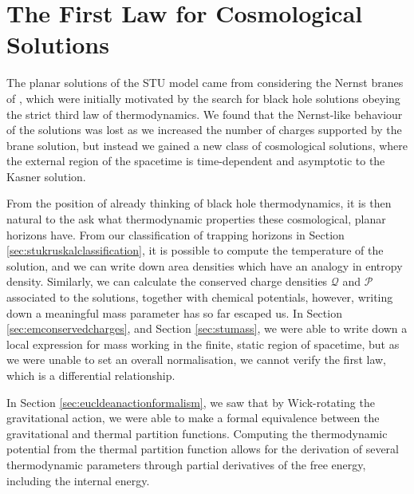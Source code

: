 \chapter{The First Law for Cosmological Solutions}
\label{ch:triplewick}

The planar solutions of the STU model came from considering the Nernst branes of \cite{Dempster:2015}, which were initially motivated by the search for black hole solutions obeying the strict third law of thermodynamics. We found that the Nernst-like behaviour of the solutions was lost as we increased the number of charges supported by the brane solution, but instead we gained a new class of cosmological solutions, where the external region of the spacetime is time-dependent and asymptotic to the Kasner solution. 

From the position of already thinking of black hole thermodynamics, it is then natural to the ask what thermodynamic properties these cosmological, planar horizons have. From our classification of trapping horizons in Section \ref{sec:stukruskalclassification}, it is possible to compute the temperature of the solution, and we can write down area densities which have an analogy in entropy density. Similarly, we can calculate the conserved charge densities $\mathcal{Q}$ and $\mathcal{P}$ associated to the solutions, together with chemical potentials, however, writing down a meaningful mass parameter has so far escaped us. In Section \ref{sec:emconservedcharges}, and Section \ref{sec:stumass}, we were able to write down a local expression for mass working in the finite, static region of spacetime, but as we were unable to set an overall normalisation, we cannot verify the first law, which is a differential relationship.

In Section \ref{sec:eucldeanactionformalism}, we saw that by Wick-rotating the gravitational action, we were able to make a formal equivalence between the gravitational and thermal partition functions. Computing the thermodynamic potential from the thermal partition function allows for the derivation of several thermodynamic parameters through partial derivatives of the free energy, including the internal energy. 

